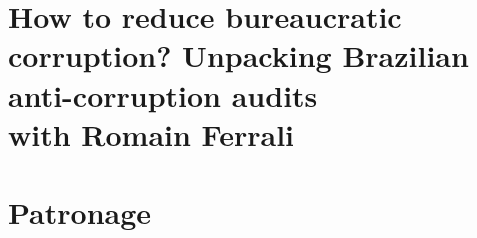 \documentclass[12pt]{report}
\theoremstyle{definition}
\begin{document}
\chapter{How to reduce bureaucratic corruption? Unpacking Brazilian anti-corruption audits \\ \medskip \large{with Romain Ferrali}}


\chapter{Patronage}


\newpage

\singlespacing


\end{document}
